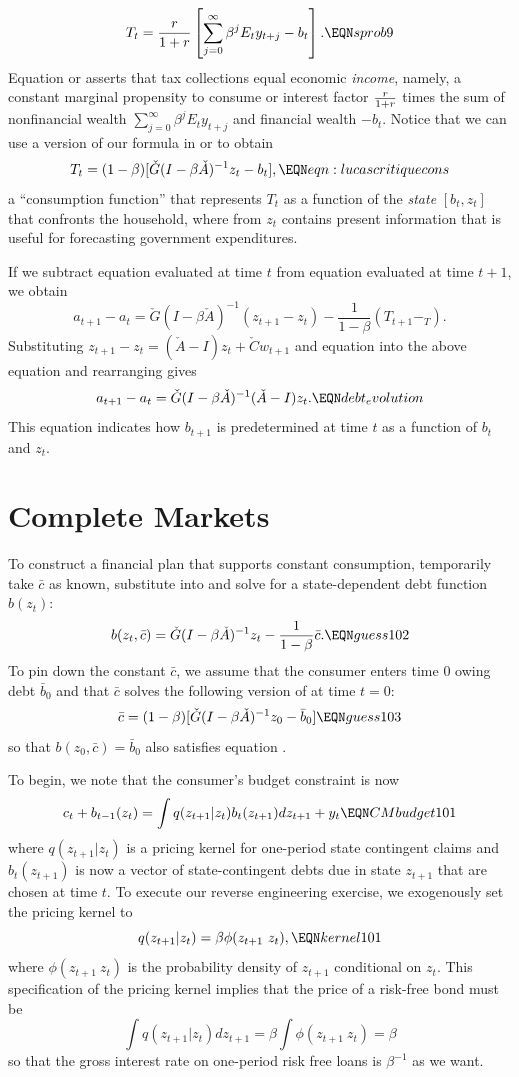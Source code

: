 $$ T_t = {r \over 1+r}
\left[ \sum_{j=0}^\infty \beta^j E_t y_{t+j} - b_t\right]. \EQN sprob9 $$
Equation  or  asserts that tax collections  equal
economic {\it income\/}, namely,  a constant
marginal propensity to consume or interest factor ${r \over 1+r}$ times
the sum of nonfinancial wealth $
\sum_{j=0}^\infty \beta^j E_t y_{t+j}$ and financial
wealth $-b_t$.   Notice that we can use a version of  our formula  in   or  to obtain
$$  T_t  = (1-\beta) [ \check G(I-\beta \check A)^{-1} z_t - b_t ]  ,  \EQN eqn:lucascritiquecons $$
a ``consumption function'' that   represents
$T_t$  as a function of the {\it state\/} $[b_t, z_t]$ that
 confronts the household, where  from  $z_t$ contains present
information that is useful for forecasting government expenditures.

If we subtract equation    evaluated at time $t$ from
equation    evaluated at time $t+1$, we obtain
$$ a_{t+1}- a_t = \check G (I-\beta \check A)^{-1} (z_{t+1} - z_t) - {\frac{1}{1-\beta}}(T_{t+1} - _T ) .$$
Substituting $z_{t+1} - z_t = (\check A - I )z_t + \check C w_{t+1}$ and equation  into the
above equation and rearranging gives
$$ a_{t+1} - a_t =\check G (I - \beta \check A)^{-1} (\check A - I) z_t . \EQN debt_evolution $$
This equation indicates how $b_{t+1}$ is predetermined at time $t$ as a function of $b_t$ and $z_t$.

\section{Complete Markets}


 To construct a financial plan that supports constant consumption, temporarily take $\bar c$ as known, substitute  into
 and solve for a state-dependent debt function $b(z_t)$:
$$ b(z_t, \bar c) =  \check G(I-\beta \check A)^{-1} z_t - {\frac{1}{1-\beta}} \bar c . \EQN guess102 $$
To pin down the constant $\bar c$, we assume that the consumer enters time $0$ owing debt $\bar b_0$ and that $\bar c$ solves  the following version of  at time $t=0$:
$$ \bar c = (1 -\beta) [ \check G(I-\beta \check A)^{-1} z_0 -  \bar b_0 ]  \EQN guess103 $$
so that $b(z_0, \bar c) = \bar b_0$ also satisfies equation .
 
To begin, we note that the consumer's budget constraint is now
$$ c_t + b_{t-1}(z_t) = \int  q(z_{t+1} | z_t ) b_t(z_{t+1}) d z_{t+1} + y_t  \EQN CMbudget101 $$
where $q(z_{t+1} | z_t)$ is a pricing kernel for one-period  state contingent claims and $b_t(z_{t+1})$ is  now a vector of state-contingent debts due in state $z_{t+1}$
 that are chosen at time $t$.
To execute our reverse engineering exercise, we exogenously set the pricing kernel to 
$$ q(z_{t+1} | z_t ) = \beta \phi(z_{t+1} \ z_t) , \EQN kernel101 $$
where $\phi(z_{t+1} \ z_t)$ is the probability density of $z_{t+1}$ conditional on $z_t$.  This specification of the pricing kernel
implies that the price of a risk-free bond must be
$$ \int q(z_{t+1} | z_t) d z_{t+1} = \beta \int \phi(z_{t+1} \ z_t) = \beta $$
so that the gross interest rate on one-period risk free loans is  $\beta^{-1}$ as we want.




